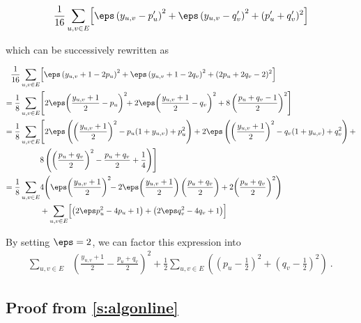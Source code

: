 \begin{equation*}
  \frac{1}{16} \sum_{u,v \in E} \Bigl[ \eps\left(y_{u,v} - p_u'\right)^2 + \eps\left(y_{u,v} - q_v'\right)^2 + (p'_u+q_v')^2 \Bigr]
\end{equation*}

which can be successively rewritten as

\begin{align*}
  \frac{1}{16} \sum_{u,v \in E} & \Bigl[ \eps\left(y_{u,v}+1 - 2p_u\right)^2 + \eps\left(y_{u,v}+1 - 2q_v\right)^2
	+ (2p_u +2q_v -2)^2 \Bigr]
\\=
	\frac{1}{8} \sum_{u,v \in E} & \Biggl[ 2\eps\!\left(\frac{y_{u,v}+1}{2} - p_u\right)^2\!\! +  2\eps\!\left(\frac{y_{u,v}+1}{2} - q_v\right)^2
	+ 8\left(\frac{p_u +q_v -1}{2}\right)^2 \Biggr]
\\=
  \frac{1}{8}\sum_{u,v \in E} & \Biggl[ 2\eps\left(\left(\frac{y_{u,v}+1}{2}\right)^2 -
    p_u(1+y_{u,v}) + p_u^2\right) + %
                              2\eps\left(\left(\frac{y_{u,v}+1}{2}\right)^2 - q_v(1+y_{u,v}) + q_v^2\right) +  \\
                              & 8\left(\left(\frac{p_u +q_v}{2}\right)^2 - \frac{p_u+q_v}{2} + \frac{1}{4} \right) \Biggr]
\\=
  \frac{1}{8}\sum_{u,v \in E} & 4\Biggl(\eps\!\left(\frac{y_{u,v}+1}{2}\right)^2\!\! -
  2\eps\!\left(\frac{y_{u,v}+1}{2}\right)\left(\frac{p_u+q_v}{2}\right)
  + 2\!\left(\frac{p_u +q_v}{2}\right)^2\Biggr)
\\&+
  \sum_{u,v \in E} \Bigl[ \left(2\eps p_u^2 - 4p_u + 1\right) + \left(2\eps q_v^2 - 4q_v + 1\right) \Bigr]
\end{align*}

By setting $\eps=2$, we can factor this expression into 
\begin{align*}
  \sum_{u,v \in E} &\left(\frac{y_{u,v}+1}{2} - \frac{p_u+q_v}{2}\right)^2
  + \frac{1}{2}\sum_{u,v \in E} \left(\left(p_u - \frac{1}{2}\right )^2 + \left(q_v -
  \frac{1}{2}\right)^2 \right)~.
\end{align*}

\subsection{Proof from \autoref{s:algonline}}
\label{proof:troll_K_mistakes}

